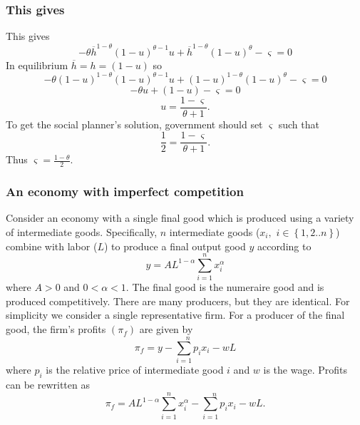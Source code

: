 \documentclass[aspectratio=169]{ltx-talk}
\begin{document}
\begin{frame}
\frametitle{This gives}
This gives%
\begin{equation*}
-\theta \overline{h}^{1-\theta }(1-u)^{\theta -1}u+\overline{h}^{1-\theta
}(1-u)^{\theta }-\varsigma =0
\end{equation*}%
In equilibrium $\overline{h}=h=(1-u)$ so 
\begin{equation*}
-\theta \left( 1-u\right) ^{1-\theta }(1-u)^{\theta -1}u+(1-u)^{1-\theta
}(1-u)^{\theta }-\varsigma =0
\end{equation*}%
\begin{equation*}
-\theta u+(1-u)-\varsigma =0
\end{equation*}%
\begin{equation*}
u=\frac{1-\varsigma }{\theta +1}.
\end{equation*}%
$\allowbreak \allowbreak $To get the social planner's solution, government
should set $\varsigma $ such that 
\begin{equation*}
\frac{1}{2}=\frac{1-\varsigma }{\theta +1}.
\end{equation*}%
Thus $\varsigma =\frac{1-\theta }{2}.$
\end{frame}

\begin{frame}
\frametitle{An economy with imperfect competition}
Consider an economy with a single final good which is produced using a
variety of intermediate goods. Specifically, $n$ intermediate goods ($x_{i},$
$i\in \left\{ 1,2..n\right\} $) combine with labor ($L$) to produce a final
output good $y$ according to 
\begin{equation*}
y=AL^{1-\alpha }\overset{n}{\underset{i=1}{\sum }}x_{i}^{\alpha }
\end{equation*}%
where $A>0$ and $0<\alpha <1.$ The final good is the numeraire good and is
produced competitively. There are many producers, but they are identical.
For simplicity we consider a single representative firm. For a producer of
the final good, the firm's profits $\left( \pi _{f}\right) $ are given by 
\begin{equation*}
\pi _{f}=y-\overset{n}{\underset{i=1}{\sum }p_{i}}x_{i}-wL
\end{equation*}%
where $p_{i}$ is the relative price of intermediate good $i$ and $w$ is the
wage. Profits can be rewritten as%
\begin{equation*}
\pi _{f}=AL^{1-\alpha }\overset{n}{\underset{i=1}{\sum }}x_{i}^{\alpha }-%
\overset{n}{\underset{i=1}{\sum }p_{i}}x_{i}-wL.
\end{equation*}%
\end{frame}
\end{document}
